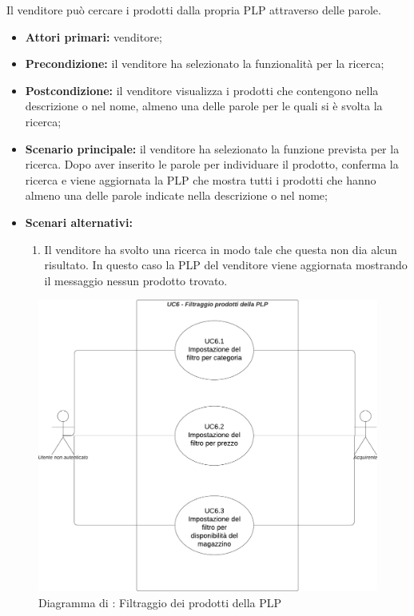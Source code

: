 Il venditore può cercare i prodotti dalla propria PLP attraverso delle parole.
\begin{itemize}
	\item \textbf{Attori primari:} venditore;
	\item \textbf{Precondizione:} il venditore ha selezionato la funzionalità per la ricerca;
	\item \textbf{Postcondizione:} il venditore visualizza i prodotti che contengono nella descrizione o nel nome, almeno una delle parole per le quali si è svolta la ricerca;
	\item \textbf{Scenario principale:} il venditore ha selezionato la funzione prevista per la ricerca. Dopo aver inserito le parole per individuare il prodotto, conferma la ricerca e viene aggiornata la PLP che mostra tutti i prodotti che hanno almeno una delle parole indicate nella descrizione o nel nome;
	\item \textbf{Scenari alternativi:}
	\begin{enumerate}[label=\lett]
		\item Il venditore ha svolto una ricerca in modo tale che questa non dia alcun risultato. In questo caso la PLP del venditore viene aggiornata mostrando il messaggio nessun prodotto trovato.
	\end{enumerate}
\end{itemize}


\begin{figure}[H]
	\centering
	\includegraphics[scale=0.5]{Immagini/DiagrammiUC/UC6FiltraggioProdottiDellaPLP.png}
	\caption{Diagramma di \actualUC: Filtraggio dei prodotti della PLP} 
\end{figure}


